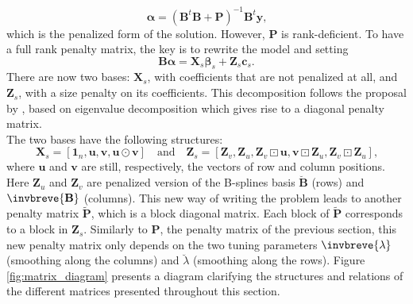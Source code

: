 \[
    \widehat{\boldsymbol{\alpha}}=\left(\boldsymbol{B}^{t} \boldsymbol{B}+\boldsymbol{P}\right)^{-1} \boldsymbol{B}^{t} 
    \boldsymbol{y}
    \text{,}
\]
which is the penalized form of the solution. However, $\boldsymbol{P}$ is rank-deficient.
To have a full rank penalty matrix, the key is to rewrite the model and setting
\[
    \mathbf{B}\boldsymbol{\alpha} = \boldsymbol{X}_{s} \boldsymbol{\beta}_{s}+\boldsymbol{Z}_{s} \boldsymbol{c}_{s}
    \text{.}
\]
There are now two bases: $\mathbf{X}_{s}$, with coefficients that are not penalized at all, and $\mathbf{Z}_{s}$, with a size 
penalty on its coefficients. This decomposition follows the proposal by \textcite{lee_p-spline_2011}, based on eigenvalue 
decomposition which gives rise to a diagonal penalty matrix.\\

The two bases have the following structures:
\begin{equation*}
\boldsymbol{X}_{s}=\left[\mathbf{1}_{n}, \boldsymbol{u}, \boldsymbol{v}, \boldsymbol{u} \odot \boldsymbol{v}\right]
    \quad
    \text{and}
    \quad
    \mathbf{Z}_{s}=\left[\mathbf{Z}_{v}, \mathbf{Z}_{u}, \mathbf{Z}_{v} \boxdot \mathbf{u}, \mathbf{v} \boxdot \mathbf{Z}_{u}, 
    \mathbf{Z}_{v} \boxdot \mathbf{Z}_{u} \right]
    \text{,}
\end{equation*}
where $\boldsymbol{u}$ and $\boldsymbol{v}$ are still, respectively, the vectors of row and column positions. 
Here $\mathbf{Z}_{u}$ and $\mathbf{Z}_{v}$ are penalized version of the B-splines basis $\breve{\mathbf{B}}$ (rows) and
$\invbreve{\mathbf{B}}$ (columns). This new way of writing the problem leads to another penalty matrix 
$ \widetilde{\boldsymbol{P}}$, which is a block diagonal matrix. Each block of $ \widetilde{\boldsymbol{P}}$ corresponds to a 
block in $\mathbf{Z}_{s}$. Similarly to $\boldsymbol{P}$, the penalty matrix of the previous section, this new penalty matrix 
only depends on the two tuning parameters $\invbreve{\lambda}$ (smoothing along the columns) and $\breve{\lambda}$ (smoothing 
along the rows).
Figure \ref{fig:matrix_diagram} presents a diagram clarifying the structures and relations of the different matrices presented 
throughout this section.\\

